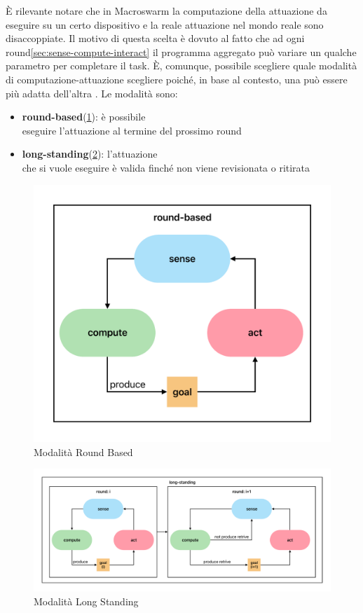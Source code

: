 \documentclass[12pt,a4paper,openright,twoside]{book}
\begin{document}
È rilevante notare che in Macroswarm la computazione della attuazione da eseguire su un certo dispositivo e la reale attuazione nel mondo reale sono disaccoppiate. Il motivo di questa scelta è dovuto al fatto che ad ogni round\cref{sec:sense-compute-interact} il programma aggregato può variare un qualche parametro per completare il task. È, comunque, possibile scegliere quale modalità di computazione-attuazione scegliere poiché, in base al contesto, una può essere più adatta dell'altra \cite{Macroswarm}. Le modalità sono:

\begin{itemize}
    \item \textbf{round-based}(\cref{fig:round-based}): è possibile \\ eseguire l'attuazione al termine del prossimo round 
    \item \textbf{long-standing}(\cref{fig:long-standong}): l'attuazione \\ che si vuole eseguire è valida finché non viene revisionata o ritirata
\end{itemize}

\begin{figure}
    \centering
    \includegraphics[width=.6\linewidth]{figures/round-based.pdf}
    \caption{Modalità Round Based}
    \label{fig:round-based}
\end{figure}

\begin{figure}
    \centering
    \includegraphics[width=.99\linewidth]{figures/long-standing.pdf}
    \caption{Modalità Long Standing}
    \label{fig:long-standong}
\end{figure}
\end{document}

